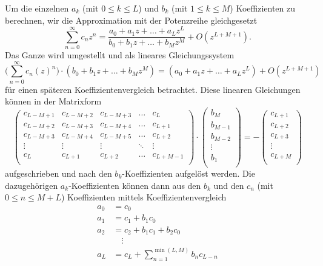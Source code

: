 Um die einzelnen $a_k$ (mit $0\leq k\leq L$) und $b_k$ (mit $1\leq k\leq M $) Koeffizienten zu berechnen, wir die Approximation mit der Potenzreihe gleichgesetzt
\begin{equation}
\sum_{n=0}^{\infty} c_{n} z^{n} 
=
\frac{a_0 + a_1 z + \dots + a_L z^L}{b_0 + b_1 z + \dots + b_M z^M}
+O(z^{L+M+1}).
\end{equation}
Das Ganze wird umgestellt und als lineares Gleichungssystem
\begin{equation}
\biggl(
\sum_{n=0}^{\infty} c_{n} (z)^{n} 
\biggr)
\cdot
(b_0 + b_1 z + \dots + b_M z^M)
=
(a_0 + a_1 z + \dots + a_L z^L) 
+
O(z^{L+M+1})
\end{equation}
für einen späteren Koeffizientenvergleich betrachtet.
Diese linearen Gleichungen können in der Matrixform 
\[
\renewcommand\arraystretch{1.25}
\begin{pmatrix}
c_{L-M+1} & c_{L-M+2} & c_{L-M+3} &\dots & c_{L}\\
c_{L-M+2} & c_{L-M+3} & c_{L-M+4} &\dots & c_{L+1}\\
c_{L-M+3} & c_{L-M+4} & c_{L-M+5} &\dots & c_{L+2}\\
\vdots & \vdots  & \vdots  &\ddots  & \vdots \\
c_{L} & c_{L+1} & c_{L+2} &\dots & c_{L+M-1}\\
\end{pmatrix}
\cdot
\begin{pmatrix}
b_{M}\\
b_{M-1}\\
b_{M-2}\\
\vdots \\
b_{1}\\
\end{pmatrix}
=
-
\begin{pmatrix}
c_{L+1}\\
c_{L+2}\\
c_{L+3}\\
\vdots \\
c_{L+M}\\
\end{pmatrix}
\label{pade:bKoeff}
\]
aufgeschrieben und nach den $b_k$-Koeffizienten aufgelöst werden.
Die dazugehörigen $a_k$-Koeffizienten können dann aus den $b_k$ und den $c_n$ (mit $0\leq n \leq M+L$) Koeffizienten mittels Koeffizientenvergleich
\begin{equation}
\begin{aligned}
a_{0}&=c_{0} \\
a_{1}&=c_{1}+b_{1} c_{0} \\
a_{2}&=c_{2}+b_{1} c_{1}+b_{2} c_{0} \\
&\quad\vdots \\
a_{L}&=c_{L}+\displaystyle\sum_{n=1}^{\min (L, M)} b_{n} c_{L-n}
\end{aligned}
\label{pade:aKoeff}
\end{equation}
